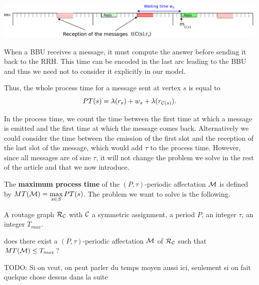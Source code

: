 \documentclass[a4paper,10pt]{article}
\newcommand{\todo}[1]{{\color{red} TODO: {#1}}}
\begin{document}
       \begin{center}
      \includegraphics[scale=0.3]{BBU2.png}
      \end{center}
     

      When a BBU receives a message, it must compute the answer before sending it back to the RRH. This time can be encoded
      in the last arc leading to the BBU and thus we need not to consider it explicitly in our model.
    
      Thus, the whole process time for a message sent at vertex $s$ is equal to
      $$
      PT(s)=\lambda(r_s)+ w_s+\lambda(r_{{\cal C}(s)}).
      $$
      
      In the process time, we count the time between the first time at which a message is emitted and 
      the first time at which the message comes back. Alternatively we could consider the time between the emission of the first slot and the reception of the last slot of the message, which would add $\tau$ to the process time.
      However, since all messages are of size $\tau$, it will not change the problem we solve in the rest of the article and that we now introduce.
      
    The {\bf maximum process time} of the $(P,\tau)$-periodic affectation ${\cal M} $ is defined by $MT({\cal M})=\max\limits_{s \in S} PT(s)$. The problem we want to solve is the following. 


        A routage graph ${\cal R}_{\cal C}$ with ${\cal C}$ a symmetric assignment, a period $P$, an integer $\tau$, an integer $T_{max}$.

       does there exist a $(P,\tau)$-periodic affectation ${\cal M}$ of ${\cal R}_{\cal C}$ such that $MT({\cal M}) \leq T_{max}$?

      \todo{Si on veut, on peut parler du temps moyen aussi ici, seulement si on fait quelque chose dessus dans la suite}
\end{document}
